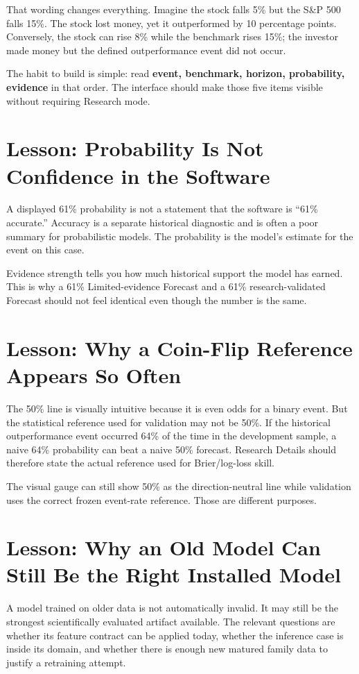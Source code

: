 \documentclass[11pt]{article}
\begin{document}
That wording changes everything. Imagine the stock falls 5\% but the S\&P 500 falls 15\%. The stock lost money, yet it outperformed by 10 percentage points. Conversely, the stock can rise 8\% while the benchmark rises 15\%; the investor made money but the defined outperformance event did not occur.

The habit to build is simple: read \textbf{event, benchmark, horizon, probability, evidence} in that order. The interface should make those five items visible without requiring Research mode.

\section{Lesson: Probability Is Not Confidence in the Software}
A displayed 61\% probability is not a statement that the software is ``61\% accurate.'' Accuracy is a separate historical diagnostic and is often a poor summary for probabilistic models. The probability is the model's estimate for the event on this case.

Evidence strength tells you how much historical support the model has earned. This is why a 61\% Limited-evidence Forecast and a 61\% research-validated Forecast should not feel identical even though the number is the same.

\section{Lesson: Why a Coin-Flip Reference Appears So Often}
The 50\% line is visually intuitive because it is even odds for a binary event. But the statistical reference used for validation may not be 50\%. If the historical outperformance event occurred 64\% of the time in the development sample, a naive 64\% probability can beat a naive 50\% forecast. Research Details should therefore state the actual reference used for Brier/log-loss skill.

The visual gauge can still show 50\% as the direction-neutral line while validation uses the correct frozen event-rate reference. Those are different purposes.

\section{Lesson: Why an Old Model Can Still Be the Right Installed Model}
A model trained on older data is not automatically invalid. It may still be the strongest scientifically evaluated artifact available. The relevant questions are whether its feature contract can be applied today, whether the inference case is inside its domain, and whether there is enough new matured family data to justify a retraining attempt.
\end{document}
